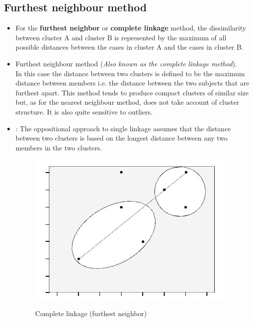 \documentclass[a4paper,12pt]{article}
\begin{document}
\subsection{Furthest neighbour method} 
\begin{itemize}	
	\item For the \textbf{furthest neighbor} or \textbf{complete linkage} method, the dissimilarity between cluster A and cluster B is represented by the maximum of all possible distances between the cases in cluster A and the cases in cluster B.
	\item Furthest neighbour method
	(\textit{Also known as the complete linkage method}).\\
	In this case the distance between two clusters is defined to be the maximum distance
	between members  i.e. the distance between the two subjects that are furthest apart.
	This method tends to produce compact clusters of similar size but, as for the nearest
	neighbour method, does not take account of cluster structure. It is also quite sensitive
	to outliers.
	\item 	: The oppositional approach to single
	linkage assumes that the distance between two clusters is based on the longest
	distance between any two members in the two clusters.
	\begin{figure}[h!]
		\begin{center}
			\includegraphics[scale=0.4]{images/Link2.jpg}\\
			\caption{Complete linkage (furthest neighbor)}
		\end{center}
	\end{figure}
\end{itemize}
\end{document}

